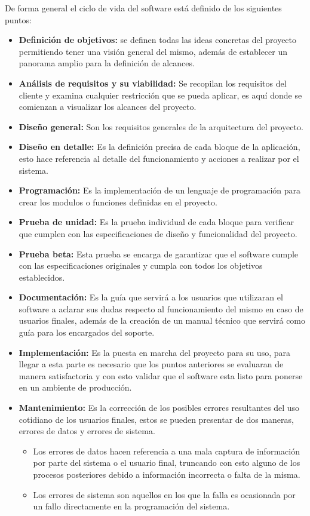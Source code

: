 	De forma general el ciclo de vida del software est\'a definido de los siguientes puntos:
	\begin{itemize}
		\item \textbf{Definici\'on de objetivos:} se definen todas las ideas concretas del proyecto permitiendo tener una visi\'on general del mismo, adem\'as de establecer un panorama amplio para la definici\'on de alcances.
		\item \textbf{An\'alisis de requisitos y su viabilidad:} Se recopilan los requisitos del cliente y examina cualquier restricci\'on que se pueda aplicar, es aqu\'i donde se comienzan a visualizar los alcances del proyecto.
		\item \textbf{Dise\~no general:} Son los requisitos generales de la arquitectura del proyecto.
		\item \textbf{Dise\~no en detalle:} Es la definici\'on precisa de cada bloque de la aplicaci\'on, esto hace referencia al detalle del funcionamiento y acciones a realizar por el sistema.
		\item \textbf{Programaci\'on:} Es la implementaci\'on de un lenguaje de programaci\'on para crear los modulos o funciones definidas en el proyecto.
		\item \textbf{Prueba de unidad:} Es la prueba individual de cada bloque para verificar que cumplen con las especificaciones de dise\~no y funcionalidad del proyecto.
		\item \textbf{Prueba beta:} Esta prueba se encarga de garantizar que el software cumple con las especificaciones originales y cumpla con todos los objetivos establecidos.
		\item \textbf{Documentaci\'on:} Es la gu\'ia que servir\'a a los usuarios que utilizaran el software a aclarar sus dudas respecto al funcionamiento del mismo en caso de usuarios finales, adem\'as de la creaci\'on de un manual t\'ecnico que servir\'a como gu\'ia para los encargados del soporte.
		\item \textbf{Implementaci\'on:} Es la puesta en marcha del proyecto para su uso, para llegar a esta parte es necesario que los puntos anteriores se evaluaran de manera satisfactoria y con esto validar que el software esta listo para ponerse en un ambiente de producci\'on.
		\item \textbf{Mantenimiento:} Es la correcci\'on de los posibles errores resultantes del uso cotidiano de los usuarios finales, estos se pueden presentar de dos maneras, errores de datos y errores de sistema. 
		\begin{itemize}
			\item Los errores de datos hacen referencia a una mala captura de informaci\'on por parte del sistema o el usuario final, truncando con esto alguno de los procesos posteriores debido a informaci\'on incorrecta o falta de la misma.
			\item Los errores de sistema son aquellos en los que la falla es ocasionada por un fallo directamente en la programaci\'on del sistema.
		\end{itemize}

	\end{itemize}


